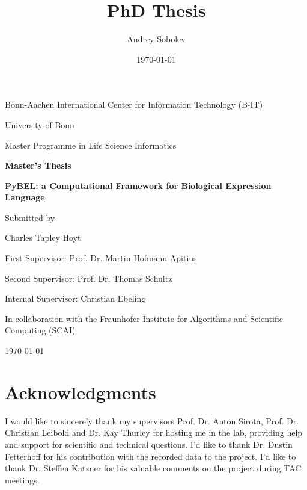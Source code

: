 \documentclass[twoside, 12pt,  footinclude=true, headinclude=true, cleardoublepage=empty]{scrbook}
\title{PhD Thesis}
\author{Andrey Sobolev}
\date{\today}
\begin{document}
\begin{titlepage}
	\centering
	Bonn-Aachen International Center for Information Technology (B-IT)

	University of Bonn

	 Master Programme in Life Science Informatics

	\vspace{1in}
	 {\Large \bfseries Master's Thesis}
	\vspace{1in}

	{\LARGE \bfseries PyBEL: a Computational Framework for Biological Expression Language}
	\vspace{1in}

	{\large Submitted by}

	{\LARGE Charles Tapley Hoyt\par}

	\vspace{1in}

		First Supervisor: Prof. Dr. Martin Hofmann-Apitius
		\par
		Second Supervisor: Prof. Dr. Thomas Schultz
		\par
		Internal Supervisor: Christian Ebeling

	\vfill
	In collaboration with the Fraunhofer Institute for Algorithms and Scientific Computing (SCAI)
	\begin{flushleft}
		\today
	\end{flushleft}

\end{titlepage}



\frontmatter

\chapter*{Acknowledgments}

\begingroup
\setlength{\parskip}{1em}

I would like to sincerely thank my supervisors Prof. Dr. Anton Sirota, Prof. Dr. Christian Leibold and Dr. Kay Thurley for hosting me in the lab, providing help and support for scientific and technical questions. I'd like to thank Dr. Dustin Fetterhoff for his contribution with the recorded data to the project. I'd like to thank Dr. Steffen Katzner for his valuable comments on the project during TAC meetings.
\end{document}
